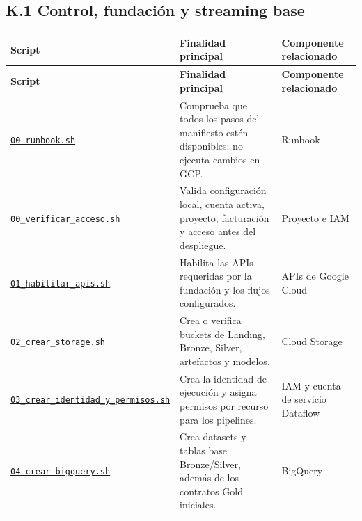 \documentclass[11pt]{article}
\begin{document}
\subsection*{K.1 Control, fundación y streaming base}
\begingroup\scriptsize
\begin{longtable}{@{}>{\raggedright\arraybackslash}p{}>{\raggedright\arraybackslash}p{}>{\raggedright\arraybackslash}p{}@{}}
\toprule
\textbf{Script} & \textbf{Finalidad principal} & \textbf{Componente relacionado} \\
\midrule
\endfirsthead
\toprule
\textbf{Script} & \textbf{Finalidad principal} & \textbf{Componente relacionado} \\
\midrule
\endhead
\href{https://github.com/Codenid/lumina-retail-data-platform/blob/main/implementation/automatizacion/scripts00_runbook.sh}{\texttt{00\_\allowbreak{}runbook.sh}} & Comprueba que todos los pasos del manifiesto estén disponibles; no ejecuta cambios en GCP. & Runbook \\
\href{https://github.com/Codenid/lumina-retail-data-platform/blob/main/implementation/automatizacion/scripts00_verificar_acceso.sh}{\texttt{00\_\allowbreak{}verificar\_\allowbreak{}acceso.sh}} & Valida configuración local, cuenta activa, proyecto, facturación y acceso antes del despliegue. & Proyecto e IAM \\
\href{https://github.com/Codenid/lumina-retail-data-platform/blob/main/implementation/automatizacion/scripts01_habilitar_apis.sh}{\texttt{01\_\allowbreak{}habilitar\_\allowbreak{}apis.sh}} & Habilita las APIs requeridas por la fundación y los flujos configurados. & APIs de Google Cloud \\
\href{https://github.com/Codenid/lumina-retail-data-platform/blob/main/implementation/automatizacion/scripts02_crear_storage.sh}{\texttt{02\_\allowbreak{}crear\_\allowbreak{}storage.sh}} & Crea o verifica buckets de Landing, Bronze, Silver, artefactos y modelos. & Cloud Storage \\
\href{https://github.com/Codenid/lumina-retail-data-platform/blob/main/implementation/automatizacion/scripts03_crear_identidad_y_permisos.sh}{\texttt{03\_\allowbreak{}crear\_\allowbreak{}identidad\_\allowbreak{}y\_\allowbreak{}permisos.sh}} & Crea la identidad de ejecución y asigna permisos por recurso para los pipelines. & IAM y cuenta de servicio Dataflow \\
\href{https://github.com/Codenid/lumina-retail-data-platform/blob/main/implementation/automatizacion/scripts04_crear_bigquery.sh}{\texttt{04\_\allowbreak{}crear\_\allowbreak{}bigquery.sh}} & Crea datasets y tablas base Bronze/Silver, además de los contratos Gold iniciales. & BigQuery \\

\end{longtable}
\end{document}

